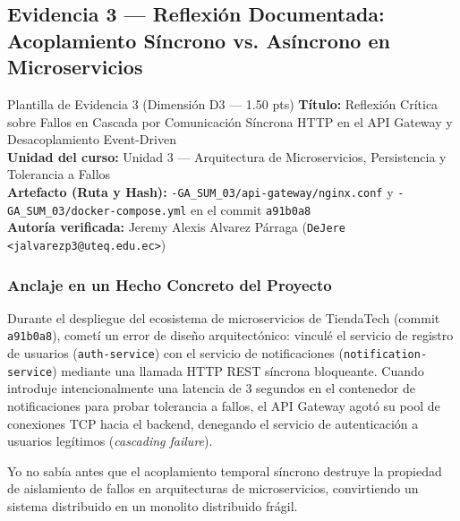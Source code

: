 \documentclass[11pt,a4paper]{article}
\begin{document}
\subsection{Evidencia 3 — Reflexión Documentada: Acoplamiento Síncrono vs. Asíncrono en Microservicios}

\begin{evidenciabox}{Plantilla de Evidencia 3 (Dimensión D3 --- 1.50 pts)}
    \textbf{Título:} Reflexión Crítica sobre Fallos en Cascada por Comunicación Síncrona HTTP en el API Gateway y Desacoplamiento Event-Driven\\
    \textbf{Unidad del curso:} Unidad 3 --- Arquitectura de Microservicios, Persistencia y Tolerancia a Fallos\\
    \textbf{Artefacto (Ruta y Hash):} \texttt{-GA\_SUM\_03/\allowbreak{}api-gateway/\allowbreak{}nginx.conf} y \texttt{-GA\_SUM\_03/\allowbreak{}docker-compose.yml} en el commit \texttt{a91b0a8}\\
    \textbf{Autoría verificada:} Jeremy Alexis Alvarez Párraga (\texttt{DeJere <jalvarezp3@uteq.edu.ec>})
\end{evidenciabox}

\subsubsection{Anclaje en un Hecho Concreto del Proyecto}
Durante el despliegue del ecosistema de microservicios de TiendaTech (commit \texttt{a91b0a8}), cometí un error de diseño arquitectónico: vinculé el servicio de registro de usuarios (\texttt{auth-service}) con el servicio de notificaciones (\texttt{notification-service}) mediante una llamada HTTP REST síncrona bloqueante. Cuando introduje intencionalmente una latencia de 3 segundos en el contenedor de notificaciones para probar tolerancia a fallos, el API Gateway agotó su pool de conexiones TCP hacia el backend, denegando el servicio de autenticación a usuarios legítimos (\textit{cascading failure}).

Yo no sabía antes que el acoplamiento temporal síncrono destruye la propiedad de aislamiento de fallos en arquitecturas de microservicios, convirtiendo un sistema distribuido en un monolito distribuido frágil.
\end{document}
